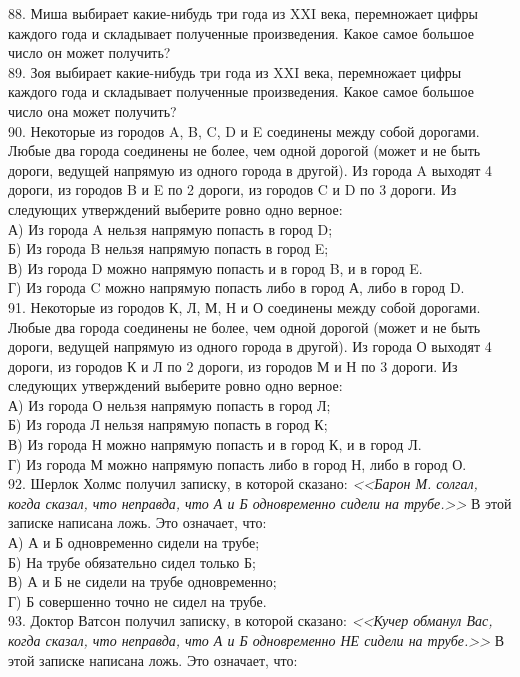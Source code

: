 88. Миша выбирает какие-нибудь три года из XXI века, перемножает цифры каждого года и складывает полученные произведения. Какое самое большое число он может получить?\\
89. Зоя выбирает какие-нибудь три года из XXI века, перемножает цифры каждого года и складывает полученные произведения. Какое самое большое число она может получить?\\
90. Некоторые из городов A, B, C, D и E соединены между собой дорогами. Любые два города соединены не более, чем одной дорогой (может и не быть дороги, ведущей напрямую из одного города в другой). Из города A выходят 4 дороги, из городов B и E по 2 дороги, из городов C и D по 3 дороги. Из следующих утверждений выберите ровно одно верное:\\
А) Из города A нельзя напрямую попасть в город D;\\
Б) Из города B нельзя напрямую попасть в город E;\\
В) Из города D можно напрямую попасть и в город B, и в город E.\\
Г) Из города C можно напрямую попасть либо в город А, либо в город D.\\
91. Некоторые из городов К, Л, М, Н и О соединены между собой дорогами. Любые два города соединены не более, чем одной дорогой (может и не быть дороги, ведущей напрямую из одного города в другой). Из города О выходят 4 дороги, из городов К и Л по 2 дороги, из городов М и Н по 3 дороги. Из следующих утверждений выберите ровно одно верное:\\
А) Из города О нельзя напрямую попасть в город Л;\\
Б) Из города Л нельзя напрямую попасть в город К;\\
В) Из города Н можно напрямую попасть и в город К, и в город Л.\\
Г) Из города М можно напрямую попасть либо в город Н, либо в город О.\\
92. Шерлок Холмс получил записку, в которой сказано: {\it <<Барон М. солгал, когда сказал, что неправда, что А и Б одновременно сидели на трубе.>>} В этой записке написана ложь. Это означает, что:\\
А) А и Б одновременно сидели на трубе;\\
Б) На трубе обязательно сидел только Б;\\
В) А и Б не сидели на трубе одновременно;\\
Г) Б совершенно точно не сидел на трубе.\\
93. Доктор Ватсон получил записку, в которой сказано: {\it <<Кучер обманул Вас, когда сказал, что неправда, что А и Б одновременно НЕ сидели на трубе.>>} В этой записке написана ложь. Это означает, что:\\
